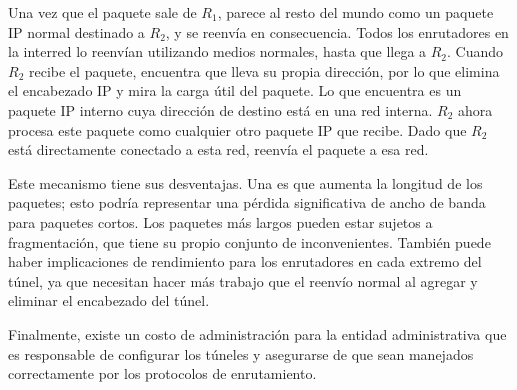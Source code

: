 Una vez que el paquete sale de \(R_1\), parece al resto del mundo como un paquete IP normal destinado a \(R_2\), y se reenvía en consecuencia. Todos los enrutadores en la interred lo reenvían utilizando medios normales, hasta que llega a \(R_2\). Cuando \(R_2\) recibe el paquete, encuentra que lleva su propia dirección, por lo que elimina el encabezado IP y mira la carga útil del paquete. Lo que encuentra es un paquete IP interno cuya dirección de destino está en una red interna. \(R_2\) ahora procesa este paquete como cualquier otro paquete IP que recibe. Dado que \(R_2\) está directamente conectado a esta red, reenvía el paquete a esa red.

Este mecanismo tiene sus desventajas. Una es que aumenta la longitud de los paquetes; esto podría representar una pérdida significativa de ancho de banda para paquetes cortos. Los paquetes más largos pueden estar sujetos a fragmentación, que tiene su propio conjunto de inconvenientes. También puede haber implicaciones de rendimiento para los enrutadores en cada extremo del túnel, ya que necesitan hacer más trabajo que el reenvío normal al agregar y eliminar el encabezado del túnel.

Finalmente, existe un costo de administración para la entidad administrativa que es responsable de configurar los túneles y asegurarse de que sean manejados correctamente por los protocolos de enrutamiento.